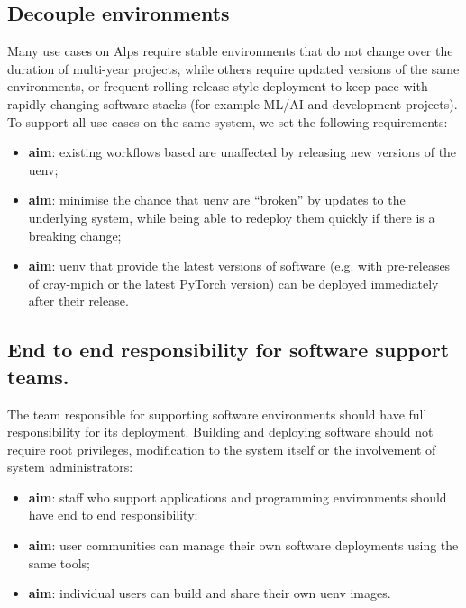 \subsection{Decouple environments}

Many use cases on Alps require stable environments that do not change over the duration of multi-year projects,
while others require updated versions of the same environments, or frequent rolling release style deployment to keep pace with rapidly changing software stacks (for example ML/AI and development projects).
To support all use cases on the same system, we set the following requirements:
\begin{itemize}
    \item \textbf{aim}: existing workflows based are unaffected by releasing new versions of the uenv;
    \item \textbf{aim}: minimise the chance that uenv are ``broken'' by updates to the underlying system, while being able to redeploy them quickly if there is a breaking change;
    \item \textbf{aim}: uenv that provide the latest versions of software (e.g. with pre-releases of cray-mpich or the latest PyTorch version) can be deployed immediately after their release.
\end{itemize}

\subsection{End to end responsibility for software support teams.}

The team responsible for supporting software environments should have full responsibility for its deployment.
Building and deploying software should not require root privileges, modification to the system itself or the involvement of system administrators:
\begin{itemize}
    \item \textbf{aim}: staff who support applications and programming environments should have end to end responsibility;
    \item \textbf{aim}: user communities can manage their own software deployments using the same tools;
    \item \textbf{aim}: individual users can build and share their own uenv images.
\end{itemize}

